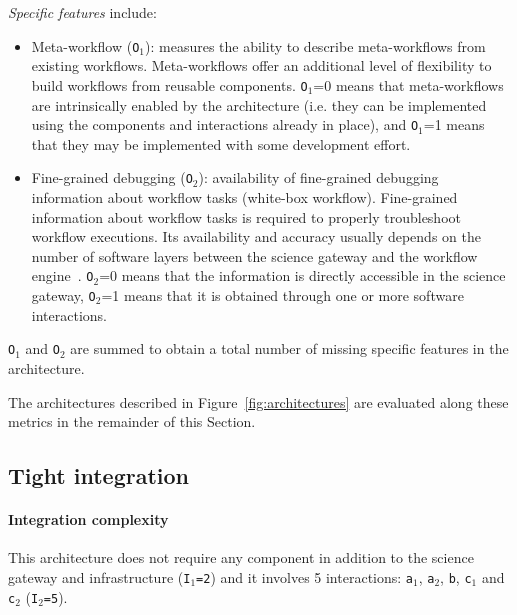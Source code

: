 \documentclass[preprint,3p,twocolumn]{elsarticle}
\begin{document}
\emph{Specific features} include:
\begin{itemize}[leftmargin=0cm,itemindent=0.35cm,itemsep=0cm]
\item Meta-workflow (\texttt{O$_1$}): measures the ability to describe
  meta-workflows from existing workflows. Meta-workflows offer an
  additional level of flexibility to build workflows from reusable
  components. \texttt{O$_1$}=0 means that meta-workflows are
  intrinsically enabled by the architecture (i.e. they can be
  implemented using the components and interactions already in place),
  and \texttt{O$_1$}=1 means that they may be implemented with some
  development effort.
  
\item Fine-grained debugging (\texttt{O$_2$}): availability of
  fine-grained debugging information about workflow tasks (white-box
  workflow).  Fine-grained information about workflow tasks is
  required to properly troubleshoot workflow executions. Its
  availability and accuracy usually depends on the number of software
  layers between the science gateway and the workflow
  engine~\cite{olabarriaga2014}. \texttt{O$_2$}=0 means that
  the information is directly accessible in the science gateway,
  \texttt{O$_2$}=1 means that it is obtained through one or more software
  interactions. 
\end{itemize}
\texttt{O$_1$} and \texttt{O$_2$} are summed to obtain a total number of missing specific
features in the architecture.



The architectures described in Figure~\ref{fig:architectures} are
evaluated along these metrics in the remainder of this Section.

\subsection{Tight integration}

\paragraph{Integration complexity} This architecture does not require any
component in addition to the science gateway and infrastructure
(\texttt{I$_1$=2}) and it involves 5 interactions: \texttt{a$_1$},
\texttt{a$_2$}, \texttt{b}, \texttt{c$_1$} and \texttt{c$_2$}
(\texttt{I$_2$=5}).
\end{document}
